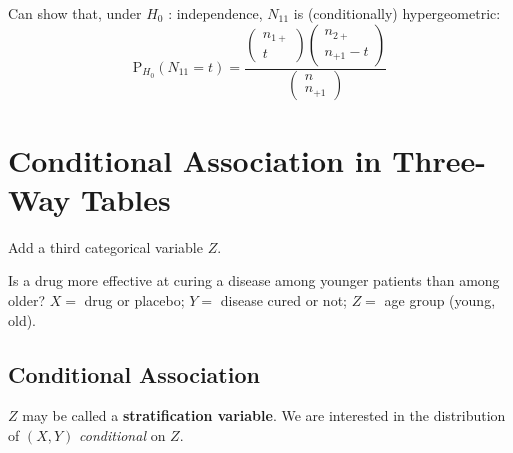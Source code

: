 \documentclass[11pt]{elegantbook}
\begin{document}
Can show that, under $H_0$ : independence, $N_{11}$ is (conditionally) hypergeometric:
$$
\mathrm{P}_{H_0}\left(N_{11}=t\right)=\frac{\begin{pmatrix}
    n_{1+} \\
    t
\end{pmatrix}\begin{pmatrix}
    n_{2+}\\
    n_{+1}-t
\end{pmatrix}}{\begin{pmatrix}
    n \\
    n_{+1}
\end{pmatrix}}
$$


\section{Conditional Association in Three-Way Tables}
Add a third categorical variable $Z$.
\begin{example}
    Is a drug more effective at curing a disease among younger patients than among older?
    $X=$ drug or placebo; $Y=$ disease cured or not; $Z=$ age group (young, old).
\end{example}
\subsection{Conditional Association}
$Z$ may be called a \textbf{stratification variable}. We are interested in the distribution of $(X, Y)$ \textit{conditional} on $Z$.
\end{document}
